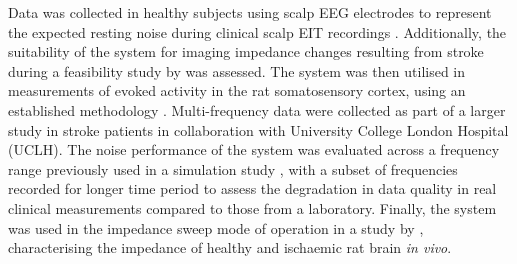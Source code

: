 Data was collected in healthy subjects using scalp EEG electrodes to represent the expected resting noise during clinical scalp EIT recordings \cite{Fabrizi_2006,fabrizi2007analysis,Romsauerova2006}. Additionally, the suitability of the system for imaging impedance changes resulting from stroke during a feasibility study by \citet{Dowrick_2016} was assessed. The system was then utilised in measurements of evoked activity in the rat somatosensory cortex, using an established methodology \cite{Oh2011,Aristovich_2016}. Multi-frequency data were collected as part of a larger study in stroke patients in collaboration with University College London Hospital (UCLH). The noise performance of the system was evaluated across a frequency range previously used in a simulation study \cite{Malone2014a}, with a subset of frequencies recorded for longer time period to assess the degradation in data quality in real clinical measurements compared to those from a laboratory. Finally, the system was used in the impedance sweep mode of operation in a study by \citet{Dowrick_2015}, characterising the impedance of healthy and ischaemic rat brain \emph{in vivo}. 

